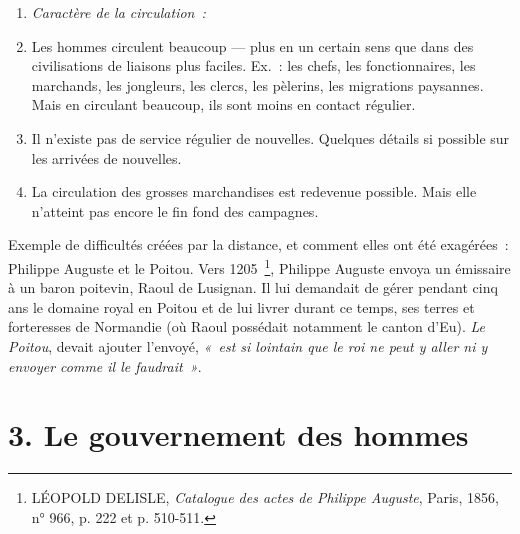 \documentclass[french,twoside]{book} %
\newlength{\listmod}
\newcommand{\listhead}[1]{\hspace{-1\listmod}\emph{#1}}
\newcommand\chapteropen{} %
\newcommand\chapterclose{} %
\begin{document}
\begin{enumerate}[itemsep=0pt,]
\item[]\listhead{Caractère de la circulation :}
\item Les hommes circulent beaucoup — plus en un certain sens que dans des civilisations de liaisons plus faciles. Ex. : les chefs, les fonctionnaires, les marchands, les jongleurs, les clercs, les pèlerins, les migrations paysannes. Mais en circulant beaucoup, ils sont moins en contact régulier.
\item Il n’existe pas de service régulier de nouvelles. Quelques détails si possible sur les arrivées de nouvelles.
\item La circulation des grosses marchandises est redevenue possible. Mais elle n’atteint pas encore le fin fond des campagnes.
\end{enumerate}

\noindent Exemple de difficultés créées par la distance, et comment elles ont été exagérées : Philippe Auguste et le Poitou. Vers 1205 \footnote{ LÉOPOLD DELISLE, {\itshape Catalogue des actes de Philippe Auguste}, Paris, 1856, n° 966, p. 222 et p. 510-511.}, Philippe Auguste envoya un émissaire à un baron poitevin, Raoul de Lusignan. Il lui demandait de gérer pendant cinq ans le domaine royal en Poitou et de lui livrer durant ce temps, ses terres et forteresses de Normandie (où Raoul possédait notamment le canton d’Eu). \emph{Le Poitou}, devait ajouter l’envoyé, \emph{« est si lointain que le roi ne peut y aller ni y envoyer comme il le faudrait »}.
\chapterclose


\chapteropen
\chapter[{3. Le gouvernement des hommes }]{\textsc{3. }Le gouvernement des hommes \protect\footnotemark }
\label{c03}\renewcommand{\leftmark}{\textsc{3. }Le gouvernement des hommes }
\end{document}
